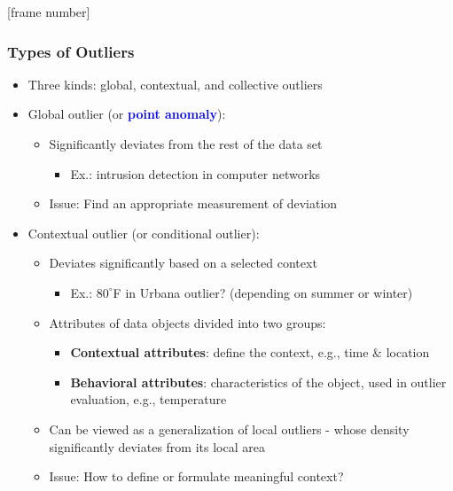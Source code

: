 \documentclass[aspectratio=169,t,xcolor=dvipsnames]{beamer}
\newcommand{\blue}[1]{\textbf{\textcolor{blue}{#1}}}
\begin{document}
%

{
    [frame number]
  \begin{frame}
   \frametitle{Types of Outliers}
	\begin{itemize}
	\item Three kinds: global, contextual, and collective outliers
	 \item \alert{Global} outlier (or \blue{point anomaly}):
    	\begin{itemize}
    	    \item Significantly deviates from the rest of the data set
    	    \begin{itemize}
    	        \item Ex.: intrusion detection in computer networks
    	    \end{itemize}
    	    \item Issue: Find an appropriate measurement of deviation
    	\end{itemize}
    \item \alert{Contextual} outlier (or conditional outlier):
        \begin{itemize}
            \item Deviates significantly based on a selected context
                \begin{itemize}
                    \item Ex.:  $80^{\circ}$F in Urbana outlier? (depending on summer or winter)
                \end{itemize}
            \item Attributes of data objects divided into two groups:
                \begin{itemize}
                    \item \textbf{Contextual attributes}: define the context, e.g., time \& location 
                    \item \textbf{Behavioral attributes}: characteristics of the object, used in outlier evaluation, e.g., temperature
                \end{itemize}
            \item Can be viewed as a generalization of local outliers - whose density significantly deviates from its local area
            \item Issue: How to define or formulate meaningful context?
        \end{itemize}
	\end{itemize}
	

\end{frame}}
\end{document}
